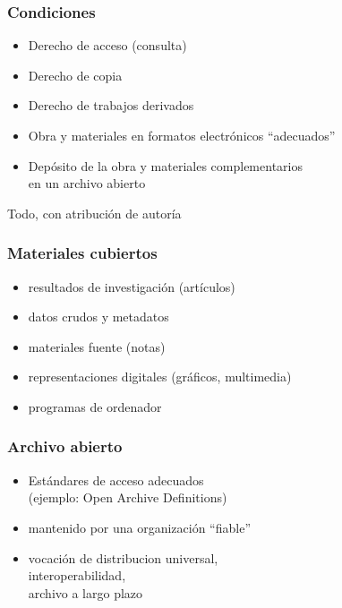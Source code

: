 \documentclass[17pt,aspectratio=169]{beamer}
\begin{document}
\begin{frame}
\frametitle{Condiciones}

\begin{itemize}
\item Derecho de acceso (consulta)
\item Derecho de copia
\item Derecho de trabajos derivados
\item Obra y materiales en formatos electrónicos ``adecuados''
\item Depósito de la obra y materiales complementarios \\
  en un archivo abierto
\end{itemize}

Todo, con atribución de autoría

\end{frame}


\begin{frame}
\frametitle{Materiales cubiertos}

\begin{itemize}
\item resultados de investigación (artículos)
\item datos crudos y metadatos
\item materiales fuente (notas)
\item representaciones digitales (gráficos, multimedia)
\item programas de ordenador
\end{itemize}

\end{frame}


\begin{frame}
\frametitle{Archivo abierto}

\begin{itemize}
\item Estándares de acceso adecuados \\
  (ejemplo: Open Archive Definitions)
\item mantenido por una organización ``fiable''
\item vocación de distribucion universal, \\
  interoperabilidad, \\
  archivo a largo plazo
\end{itemize}

\end{frame}
\end{document}
